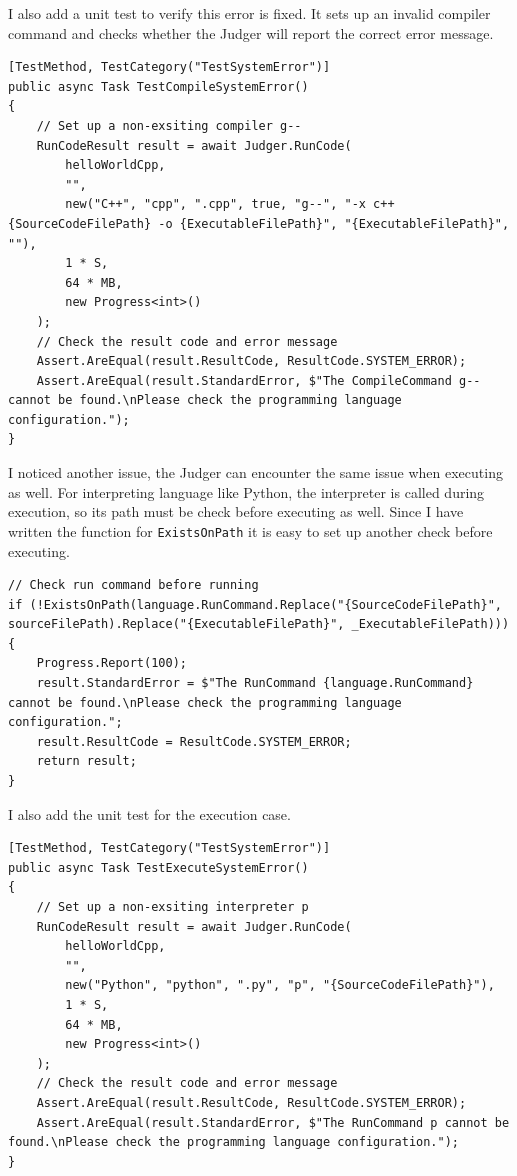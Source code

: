 \documentclass[a4paper]{report}
\newcommand{\code}{\texttt}
\begin{document}
I also add a unit test to verify this error is fixed. It sets up an invalid compiler command and checks whether the Judger will report the correct error message.

\begin{verbatim}
[TestMethod, TestCategory("TestSystemError")]
public async Task TestCompileSystemError()
{
    // Set up a non-exsiting compiler g--
    RunCodeResult result = await Judger.RunCode(
        helloWorldCpp,
        "",
        new("C++", "cpp", ".cpp", true, "g--", "-x c++ {SourceCodeFilePath} -o {ExecutableFilePath}", "{ExecutableFilePath}", ""),
        1 * S,
        64 * MB,
        new Progress<int>()
    );
    // Check the result code and error message
    Assert.AreEqual(result.ResultCode, ResultCode.SYSTEM_ERROR);
    Assert.AreEqual(result.StandardError, $"The CompileCommand g-- cannot be found.\nPlease check the programming language configuration.");
}
\end{verbatim}

I noticed another issue, the Judger can encounter the same issue when executing as well. For interpreting language like Python, the interpreter is called during execution, so its path must be check before executing as well. Since I have written the function for \code{ExistsOnPath} it is easy to set up another check before executing.

\begin{verbatim}
// Check run command before running
if (!ExistsOnPath(language.RunCommand.Replace("{SourceCodeFilePath}", sourceFilePath).Replace("{ExecutableFilePath}", _ExecutableFilePath)))
{
    Progress.Report(100);
    result.StandardError = $"The RunCommand {language.RunCommand} cannot be found.\nPlease check the programming language configuration.";
    result.ResultCode = ResultCode.SYSTEM_ERROR;
    return result;
}
\end{verbatim}

I also add the unit test for the execution case.

\begin{verbatim}
[TestMethod, TestCategory("TestSystemError")]
public async Task TestExecuteSystemError()
{
    // Set up a non-exsiting interpreter p
    RunCodeResult result = await Judger.RunCode(
        helloWorldCpp,
        "",
        new("Python", "python", ".py", "p", "{SourceCodeFilePath}"),
        1 * S,
        64 * MB,
        new Progress<int>()
    );
    // Check the result code and error message
    Assert.AreEqual(result.ResultCode, ResultCode.SYSTEM_ERROR);
    Assert.AreEqual(result.StandardError, $"The RunCommand p cannot be found.\nPlease check the programming language configuration.");
}
\end{verbatim}
\end{document}
